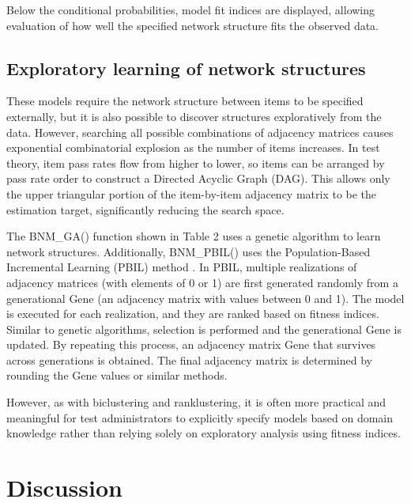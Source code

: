 Below the conditional probabilities, model fit indices are displayed, allowing evaluation of how well the specified network structure fits the observed data.

\subsection{Exploratory learning of network structures}\label{exploratory-learning-of-network-structures}

These models require the network structure between items to be specified externally, but it is also possible to discover structures exploratively from the data. However, searching all possible combinations of adjacency matrices causes exponential combinatorial explosion as the number of items increases. In test theory, item pass rates flow from higher to lower, so items can be arranged by pass rate order to construct a Directed Acyclic Graph (DAG). This allows only the upper triangular portion of the item-by-item adjacency matrix to be the estimation target, significantly reducing the search space.

The BNM\_GA() function shown in Table 2 uses a genetic algorithm to learn network structures. Additionally, BNM\_PBIL() uses the Population-Based Incremental Learning (PBIL) method \citep{Baluja1994, Fukuda2014}. In PBIL, multiple realizations of adjacency matrices (with elements of 0 or 1) are first generated randomly from a generational Gene (an adjacency matrix with values between 0 and 1). The model is executed for each realization, and they are ranked based on fitness indices. Similar to genetic algorithms, selection is performed and the generational Gene is updated. By repeating this process, an adjacency matrix Gene that survives across generations is obtained. The final adjacency matrix is determined by rounding the Gene values or similar methods.

However, as with biclustering and ranklustering, it is often more practical and meaningful for test administrators to explicitly specify models based on domain knowledge rather than relying solely on exploratory analysis using fitness indices.

\section{Discussion}\label{discussion}

